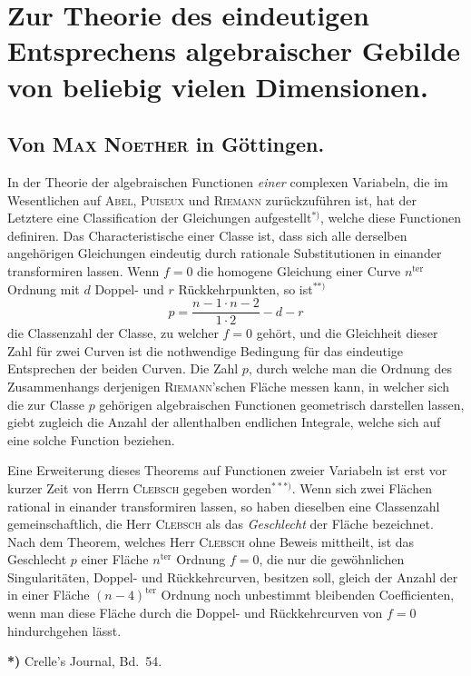 \documentclass{article}
\begin{document}
\section*{Zur Theorie des eindeutigen Entsprechens algebraischer Gebilde von beliebig vielen Dimensionen.}

\subsection*{Von \textsc{Max Noether} in Göttingen.}

In der Theorie der algebraischen Functionen \emph{einer} complexen Variabeln, die im Wesentlichen auf \textsc{Abel}, \textsc{Puiseux} und \textsc{Riemann} zurückzuführen ist, hat der Letztere eine Classification der Gleichungen aufgestellt${}^{*)}$, welche diese Functionen definiren. Das Characteristische einer Classe ist, dass sich alle derselben angehörigen Gleichungen eindeutig durch rationale Substitutionen in einander transformiren lassen. Wenn $f = 0$ die homogene Gleichung einer Curve $n^{\text{ter}}$ Ordnung mit $d$ Doppel- und $r$ Rückkehrpunkten, so ist${}^{**)}$
\[
p = \frac{n-1 \cdot n-2}{1 \cdot 2} - d - r
\]
die Classenzahl der Classe, zu welcher $f = 0$ gehört, und die Gleichheit dieser Zahl für zwei Curven ist die nothwendige Bedingung für das eindeutige Entsprechen der beiden Curven. Die Zahl $p$, durch welche man die Ordnung des Zusammenhangs derjenigen \textsc{Riemann}'schen Fläche messen kann, in welcher sich die zur Classe $p$ gehörigen algebraischen Functionen geometrisch darstellen lassen, giebt zugleich die Anzahl der allenthalben endlichen Integrale, welche sich auf eine solche Function beziehen.

Eine Erweiterung dieses Theorems auf Functionen zweier Variabeln ist erst vor kurzer Zeit von Herrn \textsc{Clebsch} gegeben worden${}^{***)}$. Wenn sich zwei Flächen rational in einander transformiren lassen, so haben dieselben eine Classenzahl gemeinschaftlich, die Herr \textsc{Clebsch} als das \emph{Geschlecht} der Fläche bezeichnet. Nach dem Theorem, welches Herr \textsc{Clebsch} ohne Beweis mittheilt, ist das Geschlecht $p$ einer Fläche $n^{\text{ter}}$ Ordnung $f = 0$, die nur die gewöhnlichen Singularitäten, Doppel- und Rückkehrcurven, besitzen soll, gleich der Anzahl der in einer Fläche $(n-4)^{\text{ter}}$ Ordnung noch unbestimmt bleibenden Coefficienten, wenn man diese Fläche durch die Doppel- und Rückkehrcurven von $f = 0$ hindurchgehen lässt.

\textbf{*)} Crelle's Journal, Bd.~54.
\end{document}
